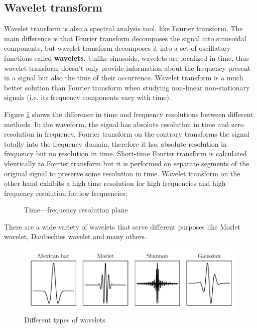 \subsection{Wavelet transform}
Wavelet transform is also a spectral analysis tool, like Fourier transform. The main difference is that Fourier transform decomposes the signal into sinusoidal components, but wavelet transform decomposes it into a set of oscillatory functions called \textbf{wavelets}. Unlike sinusoids, wavelets are localized in time, thus wavelet transform doesn't only provide information about the frequency present in a signal but also the time of their occurrence. Wavelet transform is a much better solution than Fourier transform when studying non-linear non-stationary signals (i.e. its frequency components vary with time).

Figure \ref{fig:time-frequency-plane} shows the difference in time and frequency resolutions between different methods. In the waveform, the signal has absolute resolution in time and zero resolution in frequency. Fourier transform on the contrary transforms the signal totally into the frequency domain, therefore it has absolute resolution in frequency but no resolution in time. Short-time Fourier transform is calculated identically to Fourier transform but it is performed on separate segments of the original signal to preserve some resolution in time. Wavelet transform on the other hand exhibits a high time resolution for high frequencies and high frequency resolution for low frequencies:

\begin{figure}[H]
    \centering
    
    \caption{Time—frequency resolution plane}
    \label{fig:time-frequency-plane}
\end{figure}

There are a wide variety of wavelets that serve different purposes like Morlet wavelet, Daubechies wavelet and many others.

\begin{figure}[H]
    \centering
    \includegraphics{figures/wavelets.pdf}
    \caption{Different types of wavelets}
    \label{fig:wavelets}
\end{figure}

